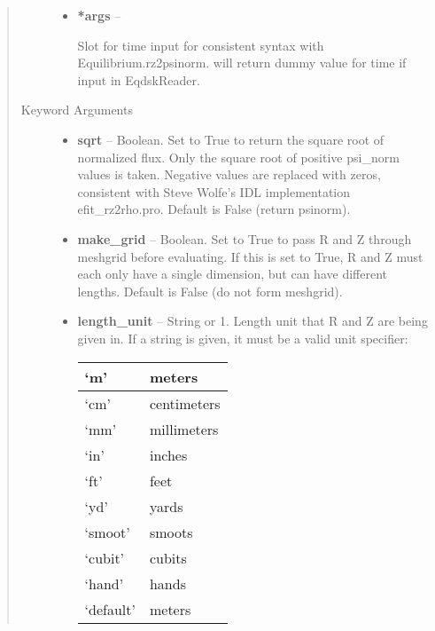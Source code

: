 \documentclass[letterpaper,10pt,english]{sphinxmanual}
\begin{document}
\begin{fulllineitems}
\begin{fulllineitems}
\begin{quote}
\begin{description}
\begin{itemize}
\item {} 
\textbf{*args} --

Slot for time input for consistent syntax with Equilibrium.rz2psinorm.
will return dummy value for time if input in EqdskReader.

\end{itemize}

\item[{Keyword Arguments}] \leavevmode\begin{itemize}
\item {} 
\textbf{sqrt} --
Boolean.
Set to True to return the square root of normalized
flux. Only the square root of positive psi\_norm values is taken.
Negative values are replaced with zeros, consistent with Steve
Wolfe's IDL implementation efit\_rz2rho.pro. Default is False
(return psinorm).

\item {} 
\textbf{make\_grid} --
Boolean.
Set to True to pass R and Z through meshgrid
before evaluating. If this is set to True, R and Z must each
only have a single dimension, but can have different lengths.
Default is False (do not form meshgrid).

\item {} 
\textbf{length\_unit} --
String or 1.
Length unit that R and Z are being given
in. If a string is given, it must be a valid unit specifier:

\begin{tabulary}{\linewidth}{|L|L|}
\hline

`m'
 & 
meters
\\\hline

`cm'
 & 
centimeters
\\\hline

`mm'
 & 
millimeters
\\\hline

`in'
 & 
inches
\\\hline

`ft'
 & 
feet
\\\hline

`yd'
 & 
yards
\\\hline

`smoot'
 & 
smoots
\\\hline

`cubit'
 & 
cubits
\\\hline

`hand'
 & 
hands
\\\hline

`default'
 & 
meters
\\\hline
\end{tabulary}



\end{itemize}
\end{description}
\end{quote}
\end{fulllineitems}
\end{fulllineitems}
\end{document}
